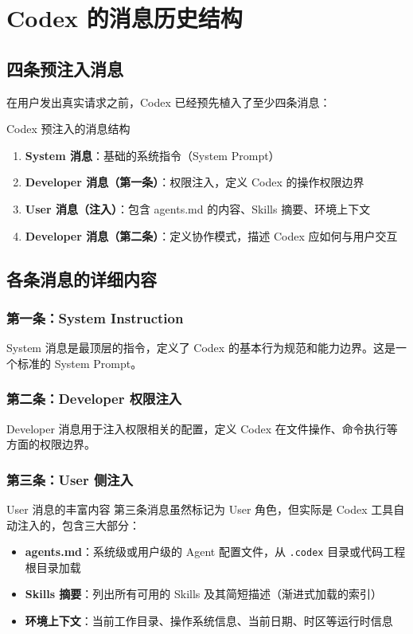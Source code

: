 \section{Codex 的消息历史结构}

\subsection{四条预注入消息}

在用户发出真实请求之前，Codex 已经预先植入了至少四条消息：

\begin{importantbox}{Codex 预注入的消息结构}
\begin{enumerate}
    \item \textbf{System 消息}：基础的系统指令（System Prompt）
    \item \textbf{Developer 消息（第一条）}：权限注入，定义 Codex 的操作权限边界
    \item \textbf{User 消息（注入）}：包含 agents.md 的内容、Skills 摘要、环境上下文
    \item \textbf{Developer 消息（第二条）}：定义协作模式，描述 Codex 应如何与用户交互
\end{enumerate}
\end{importantbox}

\subsection{各条消息的详细内容}

\subsubsection{第一条：System Instruction}

System 消息是最顶层的指令，定义了 Codex 的基本行为规范和能力边界。这是一个标准的 System Prompt。

\subsubsection{第二条：Developer 权限注入}

Developer 消息用于注入权限相关的配置，定义 Codex 在文件操作、命令执行等方面的权限边界。

\subsubsection{第三条：User 侧注入}

\begin{knowledgebox}{User 消息的丰富内容}
第三条消息虽然标记为 User 角色，但实际是 Codex 工具自动注入的，包含三大部分：
\begin{itemize}
    \item \textbf{agents.md}：系统级或用户级的 Agent 配置文件，从 \texttt{.codex} 目录或代码工程根目录加载
    \item \textbf{Skills 摘要}：列出所有可用的 Skills 及其简短描述（渐进式加载的索引）
    \item \textbf{环境上下文}：当前工作目录、操作系统信息、当前日期、时区等运行时信息
\end{itemize}
\end{knowledgebox}

